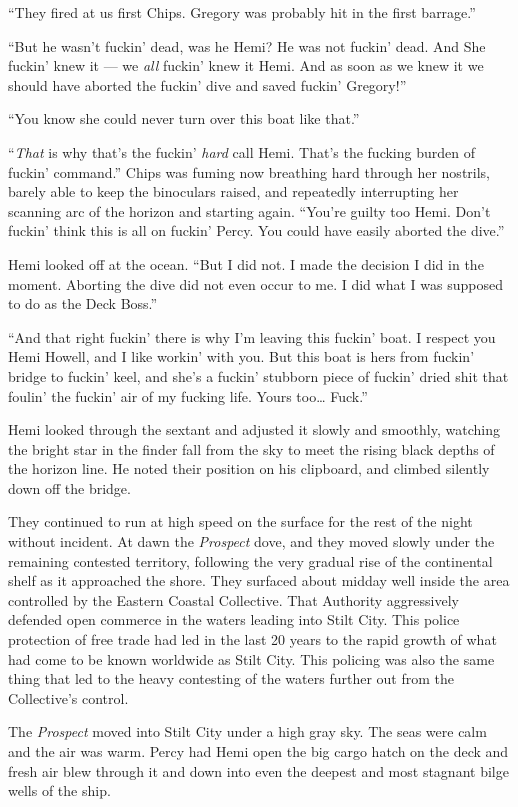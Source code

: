 \documentclass[
]{scrbook}
\begin{document}
``They fired at us first Chips. Gregory was probably hit in the first
barrage.''

``But he wasn't fuckin' dead, was he Hemi? He was not fuckin' dead. And
She fuckin' knew it --- we \emph{all} fuckin' knew it Hemi. And as soon
as we knew it we should have aborted the fuckin' dive and saved fuckin'
Gregory!''

``You know she could never turn over this boat like that.''

``\emph{That} is why that's the fuckin' \emph{hard} call Hemi. That's
the fucking burden of fuckin' command.'' Chips was fuming now breathing
hard through her nostrils, barely able to keep the binoculars raised,
and repeatedly interrupting her scanning arc of the horizon and starting
again. ``You're guilty too Hemi. Don't fuckin' think this is all on
fuckin' Percy. You could have easily aborted the dive.''

Hemi looked off at the ocean. ``But I did not. I made the decision I did
in the moment. Aborting the dive did not even occur to me. I did what I
was supposed to do as the Deck Boss.''

``And that right fuckin' there is why I'm leaving this fuckin' boat. I
respect you Hemi Howell, and I like workin' with you. But this boat is
hers from fuckin' bridge to fuckin' keel, and she's a fuckin' stubborn
piece of fuckin' dried shit that foulin' the fuckin' air of my fucking
life. Yours too\ldots{} Fuck.''

Hemi looked through the sextant and adjusted it slowly and smoothly,
watching the bright star in the finder fall from the sky to meet the
rising black depths of the horizon line. He noted their position on his
clipboard, and climbed silently down off the bridge.

They continued to run at high speed on the surface for the rest of the
night without incident. At dawn the \emph{Prospect} dove, and they moved
slowly under the remaining contested territory, following the very
gradual rise of the continental shelf as it approached the shore. They
surfaced about midday well inside the area controlled by the Eastern
Coastal Collective. That Authority aggressively defended open commerce
in the waters leading into Stilt City. This police protection of free
trade had led in the last 20 years to the rapid growth of what had come
to be known worldwide as Stilt City. This policing was also the same
thing that led to the heavy contesting of the waters further out from
the Collective's control.

The \emph{Prospect} moved into Stilt City under a high gray sky. The
seas were calm and the air was warm. Percy had Hemi open the big cargo
hatch on the deck and fresh air blew through it and down into even the
deepest and most stagnant bilge wells of the ship.
\end{document}
